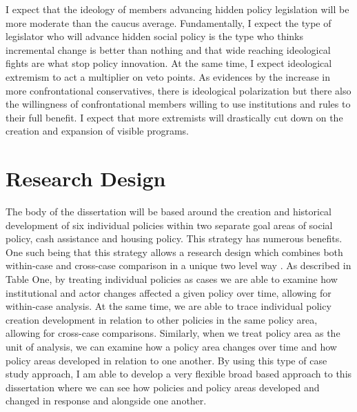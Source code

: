 \documentclass[12pt]{article}
\begin{document}
I expect that the ideology of members advancing hidden policy legislation will be more moderate than the caucus average. Fundamentally, I expect the type of legislator who will advance hidden social policy is the type who thinks incremental change is better than nothing and that wide reaching ideological fights are what stop policy innovation. At the same time, I expect ideological extremism to act a multiplier on veto points. As evidences by the increase in more confrontational conservatives, there is ideological polarization but there also the willingness of confrontational members willing to use institutions and rules to their full benefit. I expect that more extremists will drastically cut down on the creation and expansion of visible programs.


\section{Research Design}
The body of the dissertation will be based around the creation and historical development of six individual policies within two separate goal areas of social policy, cash assistance and housing policy. This strategy has numerous benefits. One such being that this strategy allows a research design which combines both within-case and cross-case comparison in a unique two level way \citep{george2005, goertz2012}. As described in Table One, by treating individual policies as cases we are able to examine how institutional and actor changes affected a given policy over time, allowing for within-case analysis. At the same time, we are able to trace individual policy creation development in relation to other policies in the same policy area, allowing for cross-case comparisons. Similarly, when we treat policy area as the unit of analysis, we can examine how a policy area changes over time and how policy areas developed in relation to one another. By using this type of case study approach, I am able to develop a very flexible broad based approach to this dissertation where we can see how policies and policy areas developed and changed in response and alongside one another. 

\end{document}
